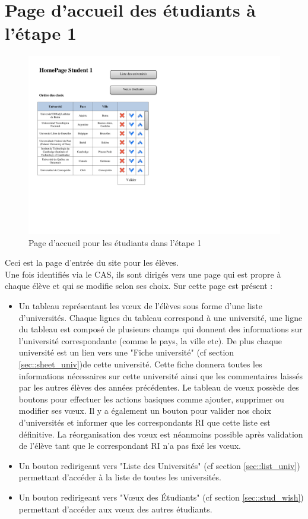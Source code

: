 \section{Page d'accueil des étudiants à l'étape 1}

\begin{figure}[H]
	\includegraphics[scale=1]{Etudiant/HomePageSt1.pdf}
	\caption{Page d'accueil pour les étudiants dans l'étape 1}
\end{figure}

Ceci est la page d'entrée du site pour les élèves.\\
Une fois identifiés via le CAS, ils sont dirigés vers une page qui est propre à chaque élève et qui se modifie selon ses choix.
Sur cette page est présent :
\begin{itemize}

\item Un tableau représentant les vœux de l'élèves sous forme d'une liste d'universités.
Chaque lignes du tableau correspond à une université, une ligne du tableau est composé de plusieurs champs qui donnent des informations sur l'université correspondante (comme le pays, la ville etc).
De plus chaque université est un lien vers une "Fiche université" (cf section \ref{sec::sheet_univ})de cette université. Cette fiche donnera toutes les informations nécessaires sur cette université ainsi que les commentaires laissés par les autres élèves des années précédentes.
Le tableau de vœux possède des boutons pour effectuer les actions basiques comme ajouter, supprimer ou modifier ses vœux. Il y a également un bouton pour valider nos choix d'universités et informer que les correspondants RI que cette liste est définitive. La réorganisation des vœux est néanmoins possible après validation de l'élève tant que le correspondant RI n'a pas fixé les vœux.
\item Un bouton redirigeant vers "Liste des Universités" (cf section \ref{sec::list_univ}) permettant d'accéder à la liste de toutes les universités.
\item Un bouton redirigeant vers "Vœux des Étudiants" (cf section \ref{sec::stud_wish}) permettant d'accéder aux vœux des autres étudiants.

\end{itemize}
